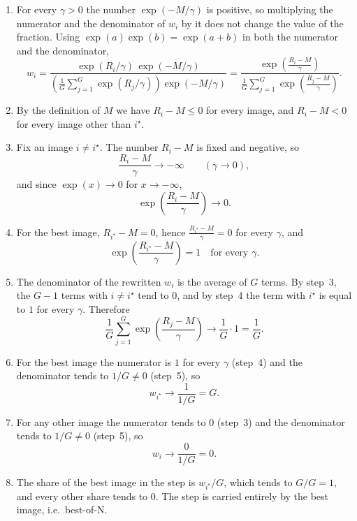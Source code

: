\documentclass[10pt]{article} %
\begin{document}
\begin{enumerate}
\item For every $\gamma>0$ the number $\exp(-M/\gamma)$ is positive, so multiplying the numerator and the denominator of $w_i$ by it does not change the value of the fraction. Using $\exp(a)\exp(b)=\exp(a+b)$ in both the numerator and the denominator,
\[
w_i
=\frac{\exp(R_i/\gamma)\,\exp(-M/\gamma)}
{\left(\frac{1}{G}\sum_{j=1}^{G}\exp(R_j/\gamma)\right)\exp(-M/\gamma)}
=\frac{\exp\left(\frac{R_i-M}{\gamma}\right)}
{\frac{1}{G}\sum_{j=1}^{G}\exp\left(\frac{R_j-M}{\gamma}\right)} .
\]
\item By the definition of $M$ we have $R_i-M\le 0$ for every image, and $R_i-M<0$ for every image other than $i^\star$.
\item Fix an image $i\neq i^\star$. The number $R_i-M$ is fixed and negative, so
\[
\frac{R_i-M}{\gamma}\to-\infty \qquad(\gamma\to 0),
\]
and since $\exp(x)\to 0$ for $x\to-\infty$,
\[
\exp\left(\frac{R_i-M}{\gamma}\right)\to 0 .
\]
\item For the best image, $R_{i^\star}-M=0$, hence $\frac{R_{i^\star}-M}{\gamma}=0$ for every $\gamma$, and
\[
\exp\left(\frac{R_{i^\star}-M}{\gamma}\right)=1 \quad\text{for every }\gamma .
\]
\item The denominator of the rewritten $w_i$ is the average of $G$ terms. By step~3, the $G-1$ terms with $i\neq i^\star$ tend to $0$, and by step~4 the term with $i^\star$ is equal to $1$ for every $\gamma$. Therefore
\[
\frac{1}{G}\sum_{j=1}^{G}\exp\left(\frac{R_j-M}{\gamma}\right)\to\frac{1}{G}\cdot 1=\frac{1}{G} .
\]
\item For the best image the numerator is $1$ for every $\gamma$ (step~4) and the denominator tends to $1/G\neq 0$ (step~5), so
\[
w_{i^\star}\to\frac{1}{1/G}=G .
\]
\item For any other image the numerator tends to $0$ (step~3) and the denominator tends to $1/G\neq 0$ (step~5), so
\[
w_i\to\frac{0}{1/G}=0 .
\]
\item The share of the best image in the step is $w_{i^\star}/G$, which tends to $G/G=1$, and every other share tends to $0$. The step is carried entirely by the best image, i.e.\ best-of-N.
\end{enumerate}
\end{document}
